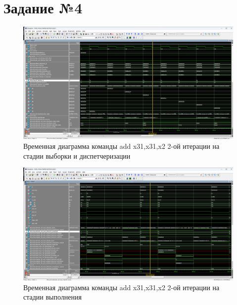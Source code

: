 \chapter{Задание №4}

\begin{figure}
    \centering
    \includegraphics[width=1\linewidth]{images/04-F_ID.png}
    \caption{Временная диаграмма команды add x31,x31,x2 2-ой итерации на стадии выборки и диспетчеризации}
    \label{fig:04-F_ID}
\end{figure}

\begin{figure}
    \centering
    \includegraphics[width=1\linewidth]{images/04-AL.png}
    \caption{Временная диаграмма команды add x31,x31,x2 2-ой итерации на стадии выполнения}
    \label{fig:04-AL}
\end{figure}